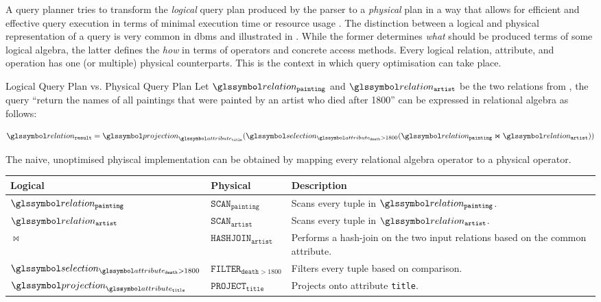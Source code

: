 A query planner tries to transform the \emph{logical} query plan produced by the parser to a \emph{physical} plan in a way that allows for efficient and effective query execution in terms of minimal execution time or resource usage \cite{Jarke:1984Query,Garcia:2009Database}. The distinction between a logical and physical representation of a query is very common in \acrshort{dbms} and illustrated in . While the former determines \emph{what} should be produced terms of some logical algebra, the latter defines the \emph{how} in terms of operators and concrete access methods. Every logical relation, attribute, and operation has one (or multiple) physical counterparts. This is the context in which query optimisation can take place.

\begin{example}[label=example:logical_vs_physical]{Logical Query Plan vs. Physical Query Plan}{}
    Let  $\relation_{\mathtt{painting}}$ and $\relation_{\mathtt{artist}}$ be the two relations from , the query ``return the names of all paintings that were painted by an artist who died after 1800'' can be expressed in relational algebra as follows:

    \begin{equation*}
        \relation_{\mathtt{result}} = \projection_{\attribute_{\mathtt{title}}} (\selection_{\attribute_{\mathtt{death}} > 1800}(\relation_{\mathtt{painting}} \Join \relation_{\mathtt{artist}}))
    \end{equation*}

    The naive, unoptimised phyiscal implementation can be obtained by mapping every relational algebra operator to a physical operator.

    \begin{center}
        \begin{tabular}{| l | l | p{8cm} |}
            \hline
            \textbf{Logical} & \textbf{Physical} & \textbf{Description} \\ 
            \hline
            \hline
            $\relation_{\mathtt{painting}}$ & $\mathtt{SCAN}_{\mathtt{painting}}$ & Scans every tuple in $\relation_{\mathtt{painting}}$. \\
            \hline
            $\relation_{\mathtt{artist}}$ & $\mathtt{SCAN}_{\mathtt{artist}}$ & Scans every tuple in $\relation_{\mathtt{artist}}$. \\
            \hline
            $\Join$ & $\mathtt{HASHJOIN}_{\mathtt{artist}}$ & Performs a hash-join on the two input relations based on the common attribute. \\
            \hline
            $\selection_{\attribute_{\mathtt{death}} > 1800}$ & $\mathtt{FILTER}_{\mathtt{death} > 1800}$ & Filters every tuple based on comparison. \\ \hline
            $\projection_{\attribute_{\mathtt{title}}}$ & $\mathtt{PROJECT}_{\mathtt{title}}$ & Projects onto attribute \texttt{title}. \\
            \hline
        \end{tabular}
    \end{center}
\end{example}

